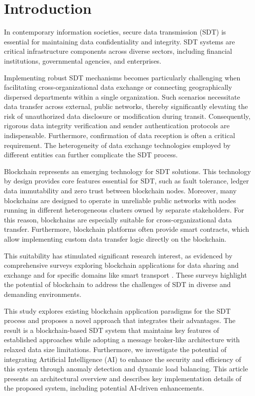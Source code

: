 \documentclass[10pt]{llncs}
\begin{document}
\section{Introduction}

In contemporary information societies, secure data transmission (SDT) is essential for maintaining data confidentiality and integrity.
SDT systems are critical infrastructure components across diverse sectors, including financial institutions, governmental agencies, and enterprises.

Implementing robust SDT mechanisms becomes particularly challenging when facilitating cross-organizational data exchange or connecting geographically dispersed departments within a single organization.
Such scenarios necessitate data transfer across external, public networks, thereby significantly elevating the risk of unauthorized data disclosure or modification during transit.
Consequently, rigorous data integrity verification and sender authentication protocols are indispensable.
Furthermore, confirmation of data reception is often a critical requirement.
The heterogeneity of data exchange technologies employed by different entities can further complicate the SDT process.

Blockchain represents an emerging technology for SDT solutions.
This technology by design provides core features essential for SDT, such as fault tolerance, ledger data immutability and zero trust between blockchain nodes.
Moreover, many blockchains are designed to operate in unreliable public networks with nodes running in different heterogeneous clusters owned by separate stakeholders.
For this reason, blockchains are especially suitable for cross-organizational data transfer.
Furthermore, blockchain platforms often provide smart contracts, which allow implementing custom data transfer logic directly on the blockchain.

This suitability has stimulated significant research interest, as evidenced by comprehensive surveys exploring blockchain applications for data sharing and exchange \cite{Song2023} and for specific domains like smart transport \cite{Bagga2022}.
These surveys highlight the potential of blockchain to address the challenges of SDT in diverse and demanding environments.

This study explores existing blockchain application paradigms for the SDT process and proposes a novel approach that integrates their advantages. 
The result is a blockchain-based SDT system that maintains key features of established approaches while adopting a message broker-like architecture with relaxed data size limitations. 
Furthermore, we investigate the potential of integrating Artificial Intelligence (AI) to enhance the security and efficiency of this system through anomaly detection and dynamic load balancing.
This article presents an architectural overview and describes key implementation details of the proposed system, including potential AI-driven enhancements.
\end{document}
